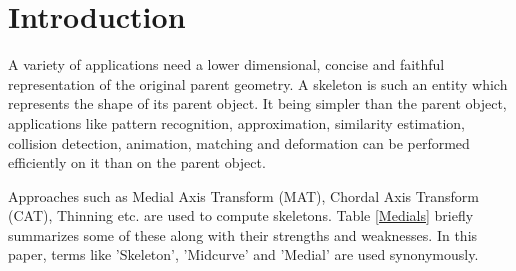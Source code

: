 \section{Introduction}

A variety of applications need a lower dimensional, concise and faithful representation of the original parent geometry. A skeleton is such an entity which represents the shape of its parent object. It being simpler than the parent object, applications like pattern recognition, approximation, similarity estimation, collision detection, animation, matching and deformation can be performed efficiently on it than on the parent object. 

Approaches such as Medial Axis Transform (MAT),  Chordal Axis Transform (CAT), Thinning etc. are used to compute skeletons. Table \ref{Medials} briefly summarizes some of these along with their strengths and weaknesses. In this paper, terms like 'Skeleton', 'Midcurve' and 'Medial' are used synonymously.

